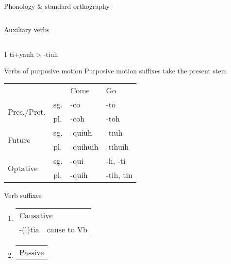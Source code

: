 \documentclass[12pt]{beamer}
\newcommand{\nah}[1]{\textcolor{nahgrn}{#1}}
\newcommand{\trs}[1]{\textcolor{nahblu}{#1}}
\begin{document}
\begin{frame}
\begin{columns}[t]
\begin{column}{.22\linewidth}
\begin{block}{Phonology \& standard orthography}
\begin{threeparttable}
\begin{tablenotes}
\begin{frame}
\begin{frame}
\begin{columns}[t]
\begin{column}{.18\linewidth}
\begin{block}{Auxiliary verbs}
\begin{threeparttable}
\begin{tabular}{lll}
                          \end{tabular}
                          \begin{tablenotes}
                          \item[1] \nah{ti+yauh} > \nah{-tiuh}
                          \end{tablenotes}
                        \end{threeparttable}
                        
                      \end{block}
                      \begin{block}{Verbs of purposive motion}
                        Purposive motion suffixes take the present stem
                        \begin{tabular}{llll}
                          &     & \trs{Come}     & \trs{Go}          \\
                          \multirow{2}{*}{Pres./Pret.} & sg. & \nah{-co}      & \nah{-to}         \\
                          & pl. & \nah{-coh}     & \nah{-toh}        \\
                          \multirow{2}{*}{Future}       & sg. & \nah{-quiuh}   & \nah{-tīuh}       \\
                          & pl. & \nah{-quihuih} & \nah{-tīhuih}     \\
                          \multirow{2}{*}{Optative}  & sg. & \nah{-qui}     & \nah{-h,   -ti}   \\
                          & pl. & \nah{-quih}    & \nah{-tih,   tin} \\
                        \end{tabular}
                      \end{block}
                      \begin{block}{Verb suffixes}
                        \begin{enumerate}
                        \item 
                          \begin{tabular}[t]{ll}
                            \multicolumn{2}{l}{Causative}\\
                            \nah{-(l)tia} & \trs{cause to Vb}
                          \end{tabular}
                        \item
                          \begin{tabular}[t]{ll}
                            \multicolumn{2}{l}{Passive}\\

\end{tabular}
\end{enumerate}
\end{block}
\end{column}
\end{columns}
\end{frame}
\end{frame}
\end{tablenotes}
\end{threeparttable}
\end{block}
\end{column}
\end{columns}
\end{frame}
\end{document}
